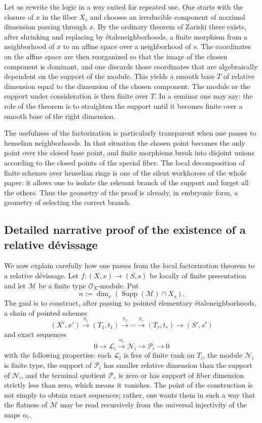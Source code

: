 \documentclass[11pt,oneside]{article}
\newcommand{\Lcal}{\mathcal L}
\newcommand{\M}{\mathcal M}
\newcommand{\N}{\mathcal N}
\newcommand{\Pcal}{\mathcal P}
\newcommand{\OO}{\mathcal O}
\newcommand{\Supp}{\operatorname{Supp}}
\newcommand{\etale}{\'etale}
\begin{document}
Let us rewrite the logic in a way suited for repeated use.  One starts with the closure of $x$ in the fiber $X_s$ and chooses an irreducible component of maximal dimension passing through $x$.  By the ordinary theorem of Zariski there exists, after shrinking and replacing by \etale neighborhoods, a finite morphism from a neighborhood of $x$ to an affine space over a neighborhood of $s$.  The coordinates on the affine space are then reorganized so that the image of the chosen component is dominant, and one discards those coordinates that are algebraically dependent on the support of the module.  This yields a smooth base $T$ of relative dimension equal to the dimension of the chosen component.  The module or the support under consideration is then finite over $T$.  In a seminar one may say: the role of the theorem is to straighten the support until it becomes finite over a smooth base of the right dimension.

The usefulness of the factorization is particularly transparent when one passes to henselian neighborhoods.  In that situation the chosen point becomes the only point over the closed base point, and finite morphisms break into disjoint unions according to the closed points of the special fiber.  The local decomposition of finite schemes over henselian rings is one of the silent workhorses of the whole paper: it allows one to isolate the relevant branch of the support and forget all the others.  Thus the geometry of the proof is already, in embryonic form, a geometry of selecting the correct branch.

\subsection{Detailed narrative proof of the existence of a relative d\'evissage}

We now explain carefully how one passes from the local factorization theorem to a relative d\'evissage.  Let $f\colon (X,x)\to (S,s)$ be locally of finite presentation and let $\M$ be a finite type $\OO_X$-module.  Put
\[
 n:=\dim_x(\Supp(\M)\cap X_s).
\]
The goal is to construct, after passing to pointed elementary \etale neighborhoods, a chain of pointed schemes
\[
(X',x')\xrightarrow{\pi_1}(T_1,t_1)\xrightarrow{\pi_2}\cdots\xrightarrow{\pi_r}(T_r,t_r)\to (S',s')
\]
and exact sequences
\[
0\to \Lcal_i\xrightarrow{\alpha_i}\N_i\to \Pcal_i\to 0
\]
with the following properties: each $\Lcal_i$ is free of finite rank on $T_i$, the module $\N_i$ is finite type, the support of $\Pcal_i$ has smaller relative dimension than the support of $\N_i$, and the terminal quotient $\Pcal_r$ is zero or has support of fiber dimension strictly less than zero, which means it vanishes.  The point of the construction is not simply to obtain exact sequences; rather, one wants them in such a way that the flatness of $\M$ may be read recursively from the universal injectivity of the maps $\alpha_i$.
\end{document}
